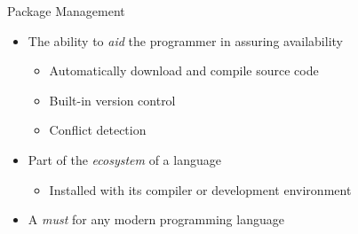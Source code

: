 \begin{secframe}{Package Management}


    \begin{itemize}

        \item The ability to \textit{aid} the programmer in assuring availability\\
            \begin{itemize}
                \item Automatically download and compile source code
                \item Built-in version control
                \item Conflict detection
            \end{itemize}

        \item Part of the \textit{ecosystem} of a language\\
            \begin{itemize}
                \item Installed with its compiler or development environment
            \end{itemize}

        \item A \textit{must} for any modern programming language\\

    \end{itemize}

    \vfill

\end{secframe}

